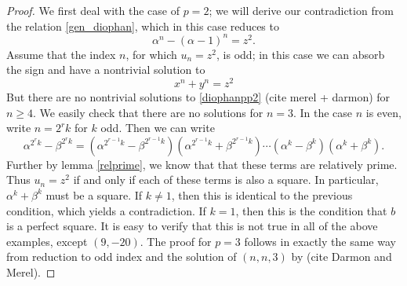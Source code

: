\documentclass[12pt]{amsart}
\theoremstyle{definition}
\begin{document}
\begin{proof}

We first deal with the case of $p=2$; we will derive our contradiction from the relation \eqref{gen_diophan}, which in this case reduces to
\begin{equation}\label{D1dio} \alpha^n - (\alpha-1)^n = z^2.\end{equation} 
Assume that the index $n$, for which $u_n = z^2$, is odd; in this case we can absorb the sign and have a nontrivial solution to
\begin{equation}\label{diophanpp2}
x^n +y^n = z^2
\end{equation}
But there are no nontrivial solutions to \eqref{diophanpp2} (cite merel + darmon) for $n \geq 4$.  We easily check that there are no solutions for $n=3$.  In the case $n$ is even, write $n=2^rk$ for $k$ odd.  Then we can write
\[ \alpha^{2^rk} - \beta^{2^rk} = (\alpha^{2^{r-1}k} - \beta^{2^{r-1}k}) (\alpha^{2^{r-1}k} + \beta^{2^{r-1}k}) \cdots (\alpha^{k} - \beta^{k}) (\alpha^{k} + \beta^{k}). \]
Further by lemma \ref{relprime}, we know that that these terms are relatively prime.  Thus $u_n=z^2$ if and only if each of these terms is also a square.  In particular, $\alpha^k + \beta^k$ must be a square.  If $k \neq 1$, then this is identical to the previous condition, which yields a contradiction.  If $k = 1$, then this is the condition that $b$ is a perfect square.  It is easy to verify that this is not true in all of the above examples, except $(9,-20)$.  The proof for $p=3$ follows in exactly the same way from reduction to odd index and the solution of $(n,n,3)$ by (cite Darmon and Merel).

\end{proof}
\end{document}
